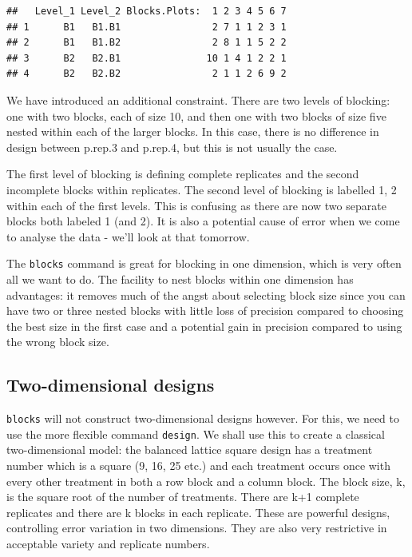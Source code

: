 \documentclass[
]{book}
\begin{document}
\begin{verbatim}
##   Level_1 Level_2 Blocks.Plots:  1 2 3 4 5 6 7
## 1      B1   B1.B1                2 7 1 1 2 3 1
## 2      B1   B1.B2                2 8 1 1 5 2 2
## 3      B2   B2.B1               10 1 4 1 2 2 1
## 4      B2   B2.B2                2 1 1 2 6 9 2
\end{verbatim}

We have introduced an additional constraint. There are two levels of blocking: one with two blocks, each of size 10, and then one with two blocks of size five nested within each of the larger blocks. In this case, there is no difference in design between p.rep.3 and p.rep.4, but this is not usually the case.

The first level of blocking is defining complete replicates and the second incomplete blocks within replicates. The second level of blocking is labelled 1, 2 within each of the first levels. This is confusing as there are now two separate blocks both labeled 1 (and 2). It is also a potential cause of error when we come to analyse the data - we'll look at that tomorrow.

The \texttt{blocks} command is great for blocking in one dimension, which is very often all we want to do. The facility to nest blocks within one dimension has advantages: it removes much of the angst about selecting block size since you can have two or three nested blocks with little loss of precision compared to choosing the best size in the first case and a potential gain in precision compared to using the wrong block size.

\hypertarget{two-dimensional-designs}{%
\subsection{Two-dimensional designs}\label{two-dimensional-designs}}

\texttt{blocks} will not construct two-dimensional designs however. For this, we need to use the more flexible command \texttt{design}. We shall use this to create a classical two-dimensional model: the balanced lattice square design has a treatment number which is a square (9, 16, 25 etc.) and each treatment occurs once with every other treatment in both a row block and a column block. The block size, k, is the square root of the number of treatments. There are k+1 complete replicates and there are k blocks in each replicate. These are powerful designs, controlling error variation in two dimensions. They are also very restrictive in acceptable variety and replicate numbers.
\end{document}
